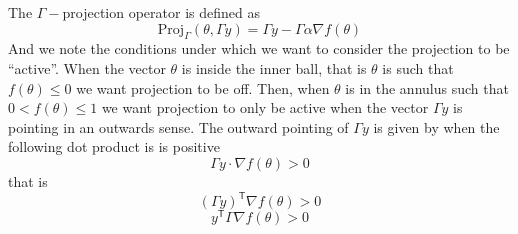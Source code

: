 The $\Gamma-$projection operator is defined as
\begin{equation*}
  \text{Proj}_{\Gamma}(\theta,\Gamma y)=\Gamma y-\Gamma\alpha\nabla f(\theta)
\end{equation*}
And we note the conditions under which we want to consider the projection to be ``active''.
When the vector $\theta$ is inside the inner ball, that is $\theta$ is such that $f(\theta)\leq0$ we want projection to be off.
Then, when $\theta$ is in the annulus such that $0<f(\theta)\leq1$ we want projection to only be active when the vector $\Gamma y$ is pointing in an outwards sense.
The outward pointing of $\Gamma y$ is given by when the following dot product is is positive
\begin{equation*}
  \Gamma y\cdot\nabla f(\theta)>0
\end{equation*}
that is
\begin{equation*}
  (\Gamma y)^{\mathsf{T}}\nabla f(\theta)>0
\end{equation*}
\begin{equation*}
  y^{\mathsf{T}}\Gamma\nabla f(\theta)>0
\end{equation*}

